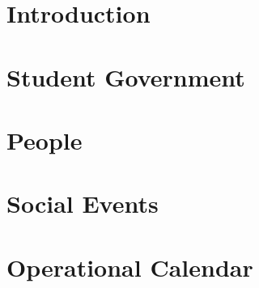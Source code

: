 


\chapter{Introduction}\label{intro}


\chapter{Student Government}\label{government}


\chapter{People}\label{people}


\chapter{Social Events}\label{events}


\chapter{Operational Calendar}\label{opcal}
















